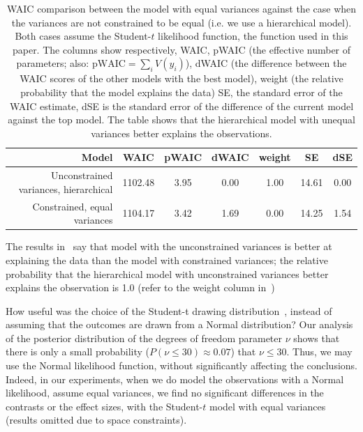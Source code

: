 
\begin{table}[htb]%
    \centering
        \caption{WAIC comparison between the model with equal variances against the case when the variances are not constrained to be equal (i.e. we use a hierarchical model). Both cases assume the Student-$t$ likelihood function, the function used in this paper. The columns show respectively, WAIC, pWAIC (the effective number of parameters; also: $\mathrm{pWAIC}=\sum_i V(y_i)$), dWAIC (the difference between the WAIC scores of the other models with the best model), weight (the relative probability that the model explains the data) SE, the standard error of the WAIC estimate, dSE is the standard error of the difference of the current model against the top model. The table shows that the hierarchical model with unequal variances better explains the observations. }\label{tab:WAIC comparison}
        \begin{tabular}{rcccccc} \toprule
            Model & WAIC & pWAIC & dWAIC & weight & SE & dSE \\ \midrule
             Unconstrained variances, hierarchical    & 1102.48    & 3.95 &     0.00 &     1.00 &     14.61 &     0.00    \\
            Constrained, equal variances & 1104.17 & 3.42 & 1.69 & 0.00 & 14.25 & 1.54        \\ \bottomrule
        \end{tabular}
    
    \end{table}

The results in~ say that model with the unconstrained variances is better at explaining the data than the model with constrained variances; the relative probability that the hierarchical model with unconstrained variances better explains the observation is 1.0 (refer to the weight column in~)

How useful was the choice of the Student-t drawing distribution~, instead of assuming that the outcomes are drawn from a Normal distribution? Our analysis of the posterior distribution of the degrees of freedom parameter $\nu$ shows that there is only a small probability ($P(\nu \leq 30) \approx 0.07$) that $\nu \leq 30$. Thus, we may use the Normal likelihood function, without significantly affecting the conclusions. Indeed, in our experiments, when we do model the observations with a Normal likelihood, assume equal variances, we find no significant differences in the contrasts or the effect sizes, with the Student-$t$ model with equal variances (results omitted due to space constraints).

